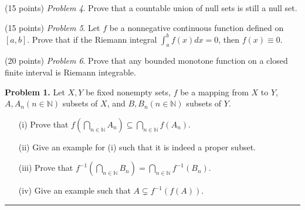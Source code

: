 \documentclass[leqno]{article}
\theoremstyle{nonumberplain}
\begin{document}
\bigskip
\noindent
(15 points) \textit{Problem 4}. \quad
Prove that a countable union of null sets is still a null set.

\bigskip
\noindent
(15 points) \textit{Problem 5}. \quad
Let $ f $ be a nonnegative continuous function defined on $ [a,b] $.
Prove that if the Riemann integral $ \int_a^b f(x) dx = 0 $,
then $ f(x) \equiv 0 $.

\bigskip
\noindent
(20 points) \textit{Problem 6}. \quad
Prove that any bounded monotone function on a closed finite interval 
is Riemann integrable.  


\pagebreak


\noindent\textbf{Problem 1.} \quad
Let $ X,Y $ be fixed nonempty sets,
$ f $ be a mapping from $ X $ to $ Y $,
$ A, A_n (n \in \mathbb{N}) $ subsets of $ X $,
and $ B, B_n (n \in \mathbb{N}) $ subsets of $ Y $.
\begin{itemize}
\item [(i)]
  Prove that
  $ \displaystyle f(\bigcap_{n \in \mathbb{N}} A_n) \subseteq \bigcap_{n \in \mathbb{N}} f(A_n) $.
\item [(ii)]
  Give an example for (i) such that it is indeed a proper subset.
\item [(iii)]
  Prove that
  $ \displaystyle f^{-1}(\bigcap_{n \in \mathbb{N}} B_n) = \bigcap_{n \in \mathbb{N}} f^{-1}(B_n) $.
\item [(iv)]
  Give an example such that
  $ \displaystyle A \subsetneq f^{-1}(f(A)) $.
\end{itemize}

\noindent\rule[0.5ex]{\linewidth}{1pt}
\end{document}
